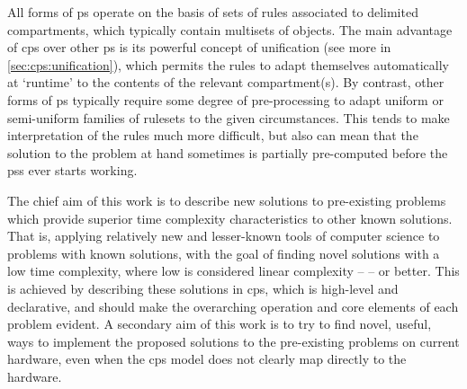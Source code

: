 All forms of \gls{ps} operate on the basis of sets of rules associated to delimited \glspl{compartment}, which typically contain multisets of objects. The main advantage of \gls{cps} over other \gls{ps} is its powerful concept of unification (see more in \vref{sec:cps:unification}), which permits the rules to adapt themselves automatically at `runtime' to the contents of the relevant \gls{compartment}(s).  By contrast, other forms of \gls{ps} typically require some degree of pre-processing to adapt uniform or semi-uniform families of \glspl{ruleset} to the given circumstances.  This tends to make interpretation of the rules much more difficult, but also can mean that the solution to the problem at hand sometimes is partially pre-computed before the \glspl{ps} ever starts working.

The chief aim of this work is to describe new solutions to pre-existing problems which provide superior time complexity characteristics to other known solutions.  That is, applying relatively new and lesser-known tools of computer science to problems with known solutions, with the goal of finding novel solutions with a low time complexity, where low is considered linear complexity --  -- or better.  
This is achieved by describing these solutions in \gls{cps}, which is high-level and declarative, and should make the overarching operation and core elements of each problem evident.
A secondary aim of this work is to try to find novel, useful, ways to implement the proposed solutions to the pre-existing problems on current hardware, even when the \gls{cps} model does not clearly map directly to the hardware.  




